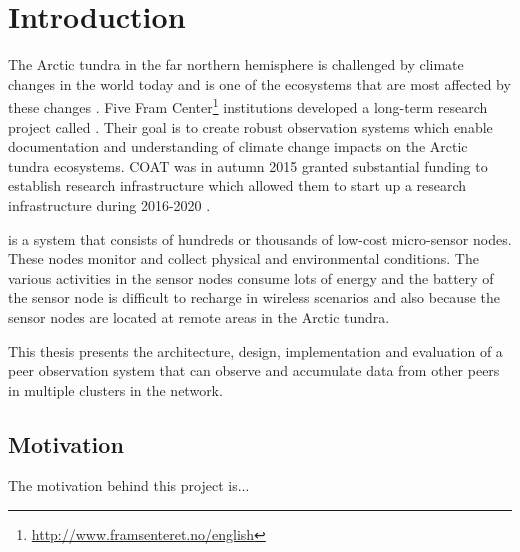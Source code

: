 \documentclass[USenglish]{uit-thesis}
\begin{document}
\tableofcontents



\printglossary


\mainmatter

\chapter{Introduction}
The Arctic tundra in the far northern hemisphere is challenged by climate changes in the world today and is one of the ecosystems that are most affected by these changes \cite{coat2016}. Five Fram Center\footnote{\url{http://www.framsenteret.no/english}} institutions developed a long-term research project called . Their goal is to create robust observation systems which enable documentation and understanding of climate change impacts on the Arctic tundra ecosystems. COAT was in autumn 2015 granted substantial funding to establish research infrastructure which allowed them to start up a research infrastructure during 2016-2020 \cite{coat2016}.

 is a system that consists of hundreds or thousands of low-cost micro-sensor nodes. These nodes monitor and collect physical and environmental conditions. The various activities  in the sensor nodes consume lots of energy and the battery of the sensor node is difficult to recharge in wireless scenarios and also because the sensor nodes are located at remote areas in the Arctic tundra.



This thesis presents the architecture, design, implementation and evaluation of a peer observation system that can observe and accumulate data from other peers in multiple clusters in the network.

\section{Motivation}
The motivation behind this project is...


\end{document}
